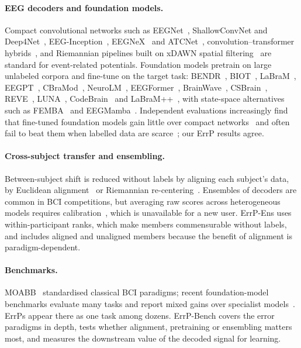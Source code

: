 \paragraph{EEG decoders and foundation models.} Compact convolutional networks such as
EEGNet~\citep{lawhern2018eegnet}, ShallowConvNet and Deep4Net~\citep{schirrmeister2017deep},
EEG-Inception~\citep{santamariavazquez2020eeginception}, EEGNeX~\citep{chen2024eegnex} and
ATCNet~\citep{altaheri2023physics}, convolution--transformer hybrids~\citep{song2023eegconformer,zhao2024ctnet},
and Riemannian pipelines built on xDAWN spatial filtering~\citep{rivet2009xdawn,barachant2012multiclass,barachant2014plug}
are standard for event-related potentials. Foundation models pretrain on large unlabeled corpora and fine-tune
on the target task: BENDR~\citep{kostas2021bendr}, BIOT~\citep{yang2023biot}, LaBraM~\citep{jiang2024labram},
EEGPT~\citep{wang2024eegpt}, CBraMod~\citep{wang2025cbramod}, NeuroLM~\citep{jiang2025neurolm},
EEGFormer~\citep{chen2024eegformer}, BrainWave~\citep{yuan2024brainwave}, CSBrain~\citep{zhou2025csbrain},
REVE~\citep{elouahidi2025reve}, LUNA~\citep{doner2025luna}, CodeBrain~\citep{ma2026codebrain} and
LaBraM++~\citep{barmpas2025advancing}, with state-space alternatives such as FEMBA~\citep{tegon2025femba} and
EEGMamba~\citep{wang2025eegmamba}. Independent evaluations increasingly find that fine-tuned foundation models
gain little over compact networks~\citep{lee2025large} and often fail to beat them when labelled data are
scarce~\citep{yang2026are}; our ErrP results agree.

\paragraph{Cross-subject transfer and ensembling.} Between-subject shift is reduced without labels by aligning
each subject's data, by Euclidean alignment~\citep{he2020transfer} or Riemannian
re-centering~\citep{zanini2018transfer}. Ensembles of decoders are common in BCI competitions, but averaging raw
scores across heterogeneous models requires calibration~\citep{guo2017calibration}, which is unavailable for a
new user. ErrP-Ens uses within-participant ranks, which make members commensurable without labels, and includes
aligned and unaligned members because the benefit of alignment is paradigm-dependent.

\paragraph{Benchmarks.} MOABB~\citep{jayaram2018moabb,chevallier2024moabbbenchmark} standardised classical BCI
paradigms; recent foundation-model benchmarks evaluate many tasks and report mixed gains over specialist
models~\citep{kastrati2025eegbench,xiong2025eegfmbench,wu2025adabrainbench,lu2026omnieegbench,liu2026eegfmcompass,kokate2026channel}.
ErrPs appear there as one task among dozens. ErrP-Bench covers the error paradigms in depth, tests whether
alignment, pretraining or ensembling matters most, and measures the downstream value of the decoded signal
for learning.
